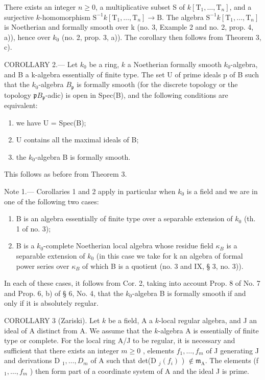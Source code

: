 There exists an integer \(n\geqslant 0\), a multiplicative subset S of \(k[\mathrm{T}_{1},\ldots,\mathrm{T}_{n}]\), and a surjective \(k\)-homomorphism \(\mathrm{S}^{-1}k[\mathrm{T}_{1},\ldots,\mathrm{T}_{n}]\to\mathrm{B}\). The algebra \(\mathrm{S}^{-1}k[\mathrm{T}_{1},\ldots,\mathrm{T}_{n}]\) is Noetherian and formally smooth over k (no. 3, Example 2 and no. 2, prop. 4, a)), hence over \(k_{0}\) (no. 2, prop. 3, a)). The corollary then follows from Theorem 3, c).

COROLLARY 2.--- Let \(k_{0}\) be a ring, \(k\) a Noetherian formally smooth \(k_{0}\)-algebra, and B a k-algebra essentially of finite type. The set U of prime ideals p of B such that the \(k_{0}\)-algebra \(B_{\mathfrak{p}}\) is formally smooth (for the discrete topology or the topology \(\mathfrak{p}B_{\mathfrak{p}}\)-adic) is open in Spec(B), and the following conditions are equivalent:

\begin{enumerate}
\def\labelenumi{(\roman{enumi})}
\item
  we have U = Spec(B);
\item
  U contains all the maximal ideals of B;
\item
  the \(k_{0}\)-algebra B is formally smooth.
\end{enumerate}

This follows as before from Theorem 3.

Note 1.--- Corollaries 1 and 2 apply in particular when \(k_{0}\) is a field and we are in one of the following two cases:

\begin{enumerate}
\def\labelenumi{\alph{enumi})}
\item
  B is an algebra essentially of finite type over a separable extension of \(k_{0}\) (th. 1 of no. 3);
\item
  B is a \(k_{0}\)-complete Noetherian local algebra whose residue field \(\kappa_{B}\) is a separable extension of \(k_{0}\) (in this case we take for k an algebra of formal power series over \(\kappa_{B}\) of which B is a quotient (no. 3 and IX, § 3, no. 3)).
\end{enumerate}

In each of these cases, it follows from Cor. 2, taking into account Prop. 8 of No. 7 and Prop. 6, b) of § 6, No. 4, that the \(k_0\)-algebra B is formally smooth if and only if it is absolutely regular.

COROLLARY 3 (Zariski). Let \(k\) be a field, A a \(k\)-local regular algebra, and J an ideal of A distinct from A. We assume that the \(k\)-algebra A is essentially of finite type or complete. For the local ring A/J to be regular, it is necessary and sufficient that there exists an integer \(m \geqslant 0\) , elements \(f_1, \ldots, f_m\) of J generating J and derivations D \(_1, \ldots, D_m\) of A such that det(D \(_j(f_i)\) ) \(\not\in \mathfrak{m}_{\mathrm{A}}\). The elements (f \(_1, \ldots, f_m\) ) then form part of a coordinate system of A and the ideal J is prime.

